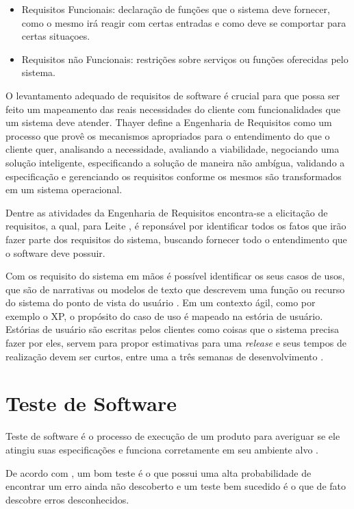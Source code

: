 \begin{itemize}
    \item Requisitos Funcionais: declaração de funções que o sistema deve fornecer, como o mesmo irá reagir com certas entradas e como deve se comportar para certas situaçoes.
    \item Requisitos não Funcionais: restrições sobre serviços ou funções oferecidas pelo sistema.
\end{itemize}

O levantamento adequado de requisitos de software é crucial para que possa ser feito um mapeamento das reais necessidades do cliente com funcionalidades que um sistema deve atender. Thayer \cite{thayer_1997} define a Engenharia de Requisitos como um processo que provê os mecanismos apropriados para o entendimento do que o cliente quer, analisando a necessidade, avaliando a viabilidade, negociando uma solução inteligente, especificando a solução de maneira não ambígua, validando a especificação e gerenciando os requisitos conforme os mesmos são transformados em um sistema operacional.

Dentre as atividades da Engenharia de Requisitos encontra-se a elicitação de requisitos, a qual, para Leite \cite{leite_1994}, é reponsável por identificar todos os fatos que irão fazer parte dos requisitos do sistema, buscando fornecer todo o entendimento que o software deve possuir.

Com os requisito do sistema em mãos é possível identificar os seus casos de usos, que são de narrativas ou modelos de texto que descrevem uma função ou recurso do sistema do ponto de vista do usuário \cite{pressman_2009}. Em um contexto ágil, como por exemplo o XP, o propósito do caso de uso é mapeado na estória de usuário. Estórias de usuário são escritas pelos clientes como coisas que o sistema precisa fazer por eles, servem para propor estimativas para uma \textit{release} e seus tempos de realização devem ser curtos, entre uma a três semanas de desenvolvimento \cite{beck_2004}.

\section{Teste de Software}
Teste de software é o processo de execução de um produto para averiguar se ele atingiu suas especificações e funciona corretamente em seu ambiente alvo \cite{artigo_intro_teste}.

De acordo com , um bom teste é o que possui uma alta probabilidade de encontrar um erro ainda não descoberto e um teste bem sucedido é o que de fato descobre erros desconhecidos.

